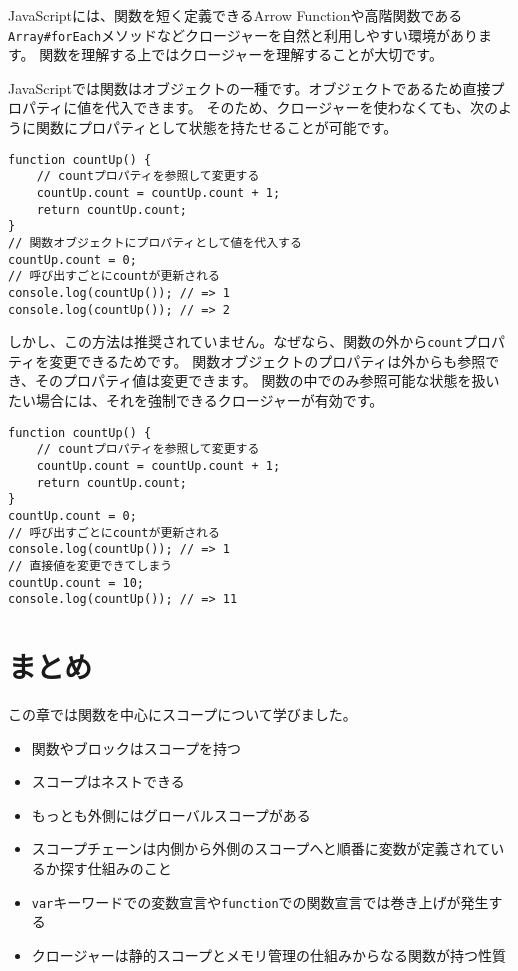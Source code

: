 JavaScriptには、関数を短く定義できるArrow
Functionや高階関数である\texttt{Array\#forEach}メソッドなどクロージャーを自然と利用しやすい環境があります。
関数を理解する上ではクロージャーを理解することが大切です。

\begin{tcolorbox}[title=状態を持つ関数オブジェクト]\label{closure-vs-function-object}

JavaScriptでは関数はオブジェクトの一種です。オブジェクトであるため直接プロパティに値を代入できます。
そのため、クロージャーを使わなくても、次のように関数にプロパティとして状態を持たせることが可能です。

\begin{lstlisting}
function countUp() {
    // countプロパティを参照して変更する
    countUp.count = countUp.count + 1;
    return countUp.count;
}
// 関数オブジェクトにプロパティとして値を代入する
countUp.count = 0;
// 呼び出すごとにcountが更新される
console.log(countUp()); // => 1
console.log(countUp()); // => 2
\end{lstlisting}

しかし、この方法は推奨されていません。なぜなら、関数の外から\texttt{count}プロパティを変更できるためです。
関数オブジェクトのプロパティは外からも参照でき、そのプロパティ値は変更できます。
関数の中でのみ参照可能な状態を扱いたい場合には、それを強制できるクロージャーが有効です。

\begin{lstlisting}
function countUp() {
    // countプロパティを参照して変更する
    countUp.count = countUp.count + 1;
    return countUp.count;
}
countUp.count = 0;
// 呼び出すごとにcountが更新される
console.log(countUp()); // => 1
// 直接値を変更できてしまう
countUp.count = 10;
console.log(countUp()); // => 11
\end{lstlisting}
\end{tcolorbox}
\newpage
\hypertarget{conclusion}{%
\section{まとめ}\label{conclusion}}

この章では関数を中心にスコープについて学びました。

\begin{itemize}
\item
  関数やブロックはスコープを持つ
\item
  スコープはネストできる
\item
  もっとも外側にはグローバルスコープがある
\item
  スコープチェーンは内側から外側のスコープへと順番に変数が定義されているか探す仕組みのこと
\item
  \texttt{var}キーワードでの変数宣言や\texttt{function}での関数宣言では巻き上げが発生する
\item
  クロージャーは静的スコープとメモリ管理の仕組みからなる関数が持つ性質
\end{itemize}
